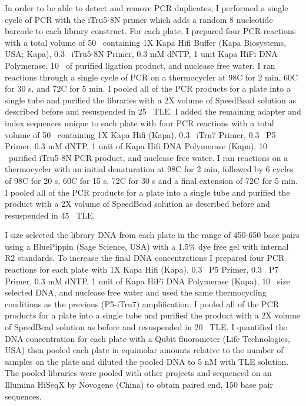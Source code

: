 In order to be able to detect and remove PCR duplicates, I performed a single   
cycle of PCR with the iTru5-8N primer which adds a random 8 nucleotide barcode to 
each library construct.  
For each plate, I prepared four PCR reactions with a total volume of 
50 \uL\ containing 1X Kapa Hifi Buffer (Kapa Biosystems, USA; Kapa),
0.3 \uM\ iTru5-8N Primer, 0.3 mM dNTP, 1 unit Kapa HiFi DNA Polymerase,
10 \uL\ of purified ligation product, and nuclease free water.
I ran reactions through a single cycle of PCR on a thermocycler at 98\degree C for 2 min, 
60\degree C for 30 s, and 72\degree C for 5 min. 
I pooled all of the PCR products for a plate into a single tube and purified the
libraries with a 2X volume of SpeedBead solution as described before and 
resuspended in 25 \uL\ TLE.
I added the remaining adapter and index sequences unique to each plate with four PCR
reactions with a total volume of 50 \uL\ containing 1X Kapa Hifi (Kapa),
0.3 \uM\ iTru7 Primer, 0.3 \uM\ P5 Primer, 0.3 mM dNTP, 1 unit of Kapa Hifi DNA Polymerase (Kapa),
10 \uL\ purified iTru5-8N PCR product, and nuclease free water.
I ran reactions on a thermocycler with an initial denaturation at 98\degree C for 2 min, 
followed by 6 cycles of 98\degree C for 20 s, 60\degree C for 15 s, 72\degree C 
for 30 s and a final extension of 72\degree C for 5 min.
I pooled all of the PCR products for a plate into a single tube and purified the
product with a 2X volume of SpeedBead solution as described before and 
resuspended in 45 \uL\ TLE.

I size selected the library DNA from each plate in the range of 450-650 base pairs using
a BluePippin (Sage Science, USA) with a 1.5\% dye free gel with internal R2 standards. 
To increase the final DNA concentrations I prepared four PCR reactions for each 
plate with 1X Kapa Hifi (Kapa), 0.3 \uM\ P5 Primer, 0.3 \uM\ P7 Primer, 0.3 mM dNTP, 
1 unit of Kapa HiFi DNA Polymerase (Kapa), 10 \uL\ size selected DNA, and 
nuclease free water and used the same thermocycling conditions as the previous
(P5-iTru7) amplification.
I pooled all of the PCR products for a plate into a single tube and purified 
the product with a 2X volume of SpeedBead solution as before and resuspended in 20 \uL\ TLE. 
I quantified the DNA concentration for each plate with a Qubit fluorometer 
(Life Technologies, USA) then pooled each plate in equimolar amounts relative 
to the number of samples on the plate and diluted the pooled DNA to 5 nM with
TLE solution. 
The pooled libraries were pooled with other projects and sequenced on an Illumina 
HiSeqX by Novogene (China) to obtain paired end, 150 base pair sequences. 

